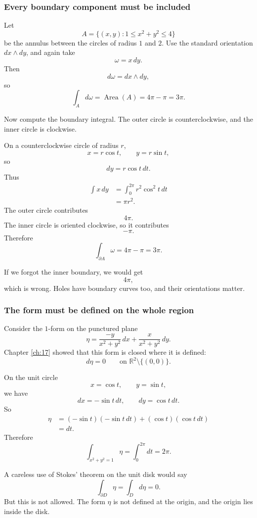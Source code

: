 \subsubsection*{Every boundary component must be included}

Let
\[
    A=\{(x,y):1\le x^2+y^2\le4\}
\]
be the annulus between the circles of radius \(1\) and \(2\).  Use the standard
orientation \(dx\wedge dy\), and again take
\[
    \omega=x\,dy.
\]
Then
\[
    d\omega=dx\wedge dy,
\]
so
\[
    \int_A d\omega=\operatorname{Area}(A)=4\pi-\pi=3\pi.
\]

Now compute the boundary integral.  The outer circle is counterclockwise, and the inner
circle is clockwise.

On a counterclockwise circle of radius \(r\),
\[
    x=r\cos t,\qquad y=r\sin t,
\]
so
\[
    dy=r\cos t\,dt.
\]
Thus
\[
\begin{aligned}
    \int x\,dy
    &=
    \int_0^{2\pi} r^2\cos^2 t\,dt\\
    &=
    \pi r^2.
\end{aligned}
\]
The outer circle contributes
\[
    4\pi.
\]
The inner circle is oriented clockwise, so it contributes
\[
    -\pi.
\]
Therefore
\[
    \int_{\partial A}\omega=4\pi-\pi=3\pi.
\]

If we forgot the inner boundary, we would get
\[
    4\pi,
\]
which is wrong.  Holes have boundary curves too, and their orientations matter.

\subsubsection*{The form must be defined on the whole region}

Consider the \(1\)-form on the punctured plane
\[
    \eta=
    \frac{-y}{x^2+y^2}\,dx
    +
    \frac{x}{x^2+y^2}\,dy.
\]
Chapter \ref{ch:17} showed that this form is closed where it is defined:
\[
    d\eta=0
    \qquad
    \text{on }
    \mathbb R^2\setminus\{(0,0)\}.
\]

On the unit circle
\[
    x=\cos t,\qquad y=\sin t,
\]
we have
\[
    dx=-\sin t\,dt,\qquad dy=\cos t\,dt.
\]
So
\[
\begin{aligned}
    \eta
    &=
    (-\sin t)(-\sin t\,dt)+(\cos t)(\cos t\,dt)\\
    &=
    dt.
\end{aligned}
\]
Therefore
\[
    \int_{x^2+y^2=1}\eta=\int_0^{2\pi}dt=2\pi.
\]

A careless use of Stokes' theorem on the unit disk would say
\[
    \int_{\partial D}\eta=\int_D d\eta=0.
\]
But this is not allowed.  The form \(\eta\) is not defined at the origin, and the origin
lies inside the disk.

